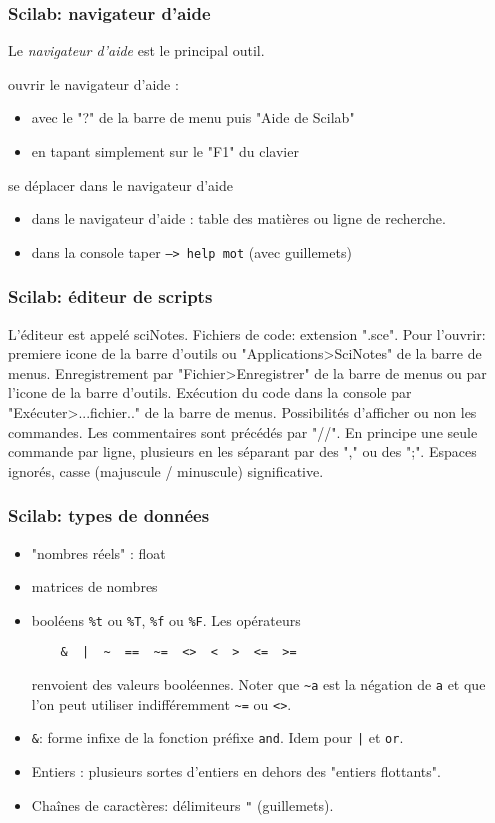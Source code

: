 \begin{frame}
  \frametitle{Scilab: navigateur d'aide}
Le \emph{navigateur d'aide} est le principal outil.

ouvrir le navigateur d'aide :
\begin{itemize}
  \item avec le "?" de la barre de menu puis "Aide de Scilab"
  \item en tapant simplement sur le "F1" du clavier
\end{itemize}
se déplacer dans le navigateur d'aide
\begin{itemize}
  \item dans le navigateur d'aide : table des matières ou ligne de recherche.
  \item dans la console taper \texttt{--> help mot} (avec guillemets)
\end{itemize}
\end{frame}

\begin{frame}
  \frametitle{Scilab: éditeur de scripts}
L'éditeur est appelé sciNotes.\newline
Fichiers de code: extension ".sce".\newline
Pour l'ouvrir: premiere icone de la barre d'outils ou  "Applications>SciNotes" de la barre de menus.\newline
Enregistrement par "Fichier>Enregistrer" de la barre de menus ou par l'icone de la barre d'outils. \newline
Exécution du code dans la console par "Exécuter>...fichier.." de la barre de menus. Possibilités d'afficher ou non les commandes.\newline
Les commentaires sont précédés par "//".\newline
En principe une seule commande par ligne, plusieurs en les séparant par des "," ou des ";".\newline
Espaces ignorés, casse (majuscule / minuscule) significative.
\end{frame}

\begin{frame}[fragile]
  \frametitle{Scilab: types de données}
\begin{itemize}
  \item "nombres réels" : float
  \item matrices de nombres
  \item booléens \texttt{\%t} ou \texttt{\%T}, \texttt{\%f} ou \texttt{\%F}. Les opérateurs 
  \begin{verbatim}
    &  |  ~  ==  ~=  <>  <  >  <=  >=
  \end{verbatim}
renvoient des valeurs booléennes. Noter que \verb|~a| est la négation de \texttt{a} et que l'on peut utiliser indifféremment \verb|~=| ou \texttt{<>}.
\item \texttt{\&}: forme infixe de la fonction préfixe \texttt{and}. Idem pour \texttt{|} et \texttt{or}.
\item Entiers : plusieurs sortes d'entiers en dehors des "entiers flottants".
\item Chaînes de caractères: délimiteurs \texttt{"} (guillemets).
\end{itemize}
\end{frame}

